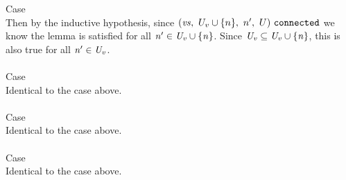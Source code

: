 \documentclass[12pt]{article}
\begin{document}
Case
\\

Then by the inductive hypothesis, since $(\mathit{vs},\ U_v \cup
  \{n\},\ n',\ U)\ \mathtt{connected}$ we know the lemma is satisfied for all
$\mathit{n'} \in \mathit{U_v \cup \{n\}}$. Since $\mathit{U_v} \subseteq
\mathit{U_v \cup \{n\}}$, this is also true for all $\mathit{n'} \in
\mathit{U_v}$.\\
\\

Case
\\

Identical to the case above.\\
\\

Case
\\

Identical to the case above.\\
\\

Case
\\

Identical to the case above.\\
\\
\end{document}
